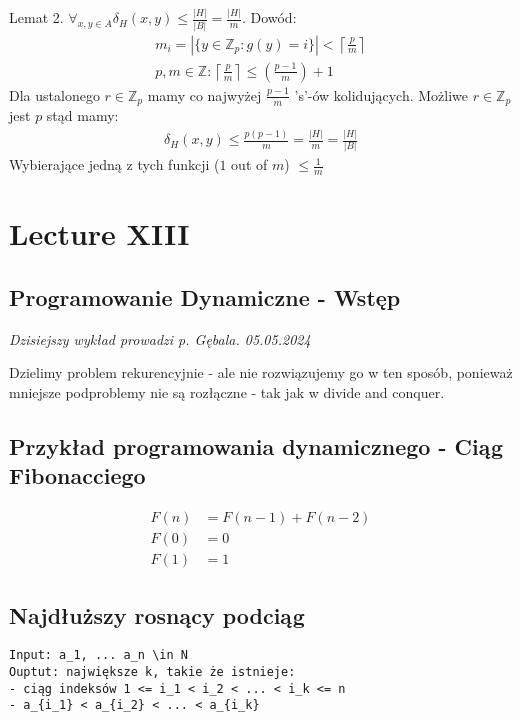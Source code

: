 \documentclass{article}
\numberwithin{equation}{subsection}
\begin{document}
Lemat 2. $\forall_{x,y\in A} \delta_{H}(x,y) \leq \frac{|H|}{|B|} = \frac{|H|}{m}$. Dowód:
\begin{align}
    m_i = |\{y\in\mathbb{Z}_p : g(y) = i\}| < \left\lceil \frac{p}{m} \right\rceil\\
    p, m \in \mathbb{Z} : \left\lceil \frac{p}{m} \right\rceil \leq \left(\frac{p-1}{m}\right) + 1
\end{align}
Dla ustalonego $r\in\mathbb{Z}_p$ mamy co najwyżej $\frac{p-1}{m}$ 's'-ów kolidujących. Możliwe $r\in\mathbb{Z}_p$ jest $p$ stąd mamy:
\begin{align}
    \delta_H(x,y) \leq \frac{p(p-1)}{m} = \frac{|H|}{m} = \frac{|H|}{|B|}
\end{align}
Wybierające jedną z tych funkcji ($1$ out of $m$) $\leq \frac{1}{m}$

\section{Lecture XIII}

\subsection{Programowanie Dynamiczne - Wstęp}

\textit{Dzisiejszy wykład prowadzi p. Gębala. 05.05.2024}

Dzielimy problem rekurencyjnie - ale nie rozwiązujemy go w ten sposób,
ponieważ mniejsze podproblemy nie są rozłączne - tak jak w divide and conquer.\\

\subsection{Przykład programowania dynamicznego - Ciąg Fibonacciego}

\begin{align}
    F(n) &= F(n-1) + F(n-2)\\
    F(0) &= 0\\
    F(1) &= 1
\end{align}

\subsection{Najdłuższy rosnący podciąg}

\begin{verbatim}
Input: a_1, ... a_n \in N
Ouptut: największe k, takie że istnieje:
- ciąg indeksów 1 <= i_1 < i_2 < ... < i_k <= n
- a_{i_1} < a_{i_2} < ... < a_{i_k}
\end{verbatim}
\end{document}
